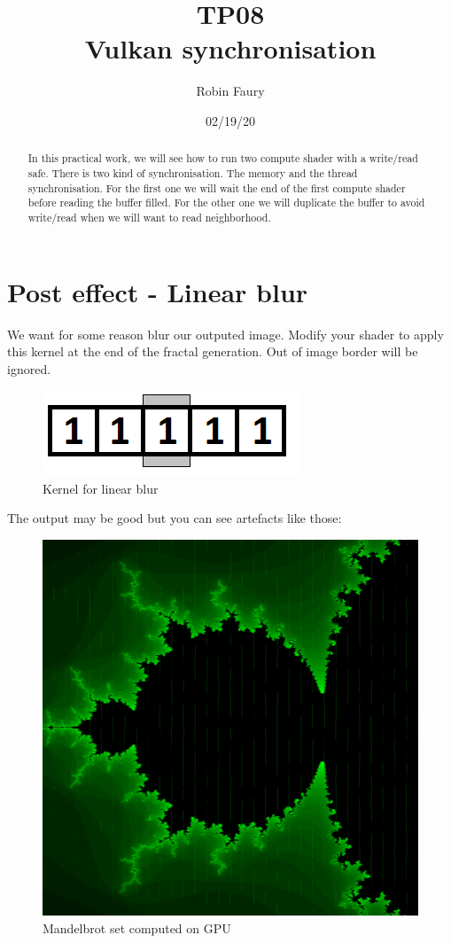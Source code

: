 \documentclass{article}
\begin{document}
\title{TP08\\Vulkan synchronisation}
\author{Robin Faury}
\date{02/19/20}
\maketitle

\begin{abstract}
	In this practical work, we will see how to run two compute shader with a write/read safe. There is two kind of synchronisation. The memory and the thread synchronisation. For the first one we will wait the end of the first compute shader before reading the buffer filled. For the other one we will duplicate the buffer to avoid write/read when we will want to read neighborhood.
\end{abstract}

\section{Post effect - Linear blur}
We want for some reason blur our outputed image. Modify your shader to apply this kernel at the end of the fractal generation. Out of image border will be ignored.

\begin{figure}[H]
	\centering
	\includegraphics[scale=0.9]{figures/kernel_blur.png}
	\caption{Kernel for linear blur}
\end{figure}

The output may be good but you can see artefacts like those:

\begin{figure}[H]
	\centering
	\includegraphics[scale=0.24]{figures/Mandelbrot_issues.png}
	\caption{Mandelbrot set computed on GPU}
\end{figure}
\end{document}
